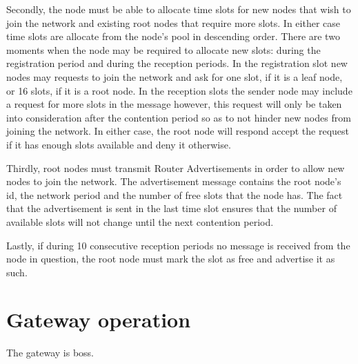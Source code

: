 Secondly, the node must be able to allocate time slots for new nodes that wish
to join the network and existing root nodes that require more slots. In either
case time slots are allocate from the node's pool in descending order. There
are two moments when the node may be required to allocate new slots: during the
registration period and during the reception periods. In the registration slot
new nodes may requests to join the network and ask for one slot, if it is a
leaf node, or 16 slots, if it is a root node. In the reception slots the sender
node may include a request for more slots in the message however, this request
will only be taken into consideration after the contention period so as to not
hinder new nodes from joining the network. In either case, the root node will
respond accept the request if it has enough slots available and deny it
otherwise.  

Thirdly, root nodes must transmit Router Advertisements in order to allow new
nodes to join the network. The advertisement message contains the root node's
id, the network period and the number of free slots that the node has. The fact
that the advertisement is sent in the last time slot ensures that the number of
available slots will not change until the next contention period.

Lastly, if during 10 consecutive reception periods no message is received from
the node in question, the root node must mark the slot as free and advertise it
as such.

\section{Gateway operation}

The gateway is boss.

